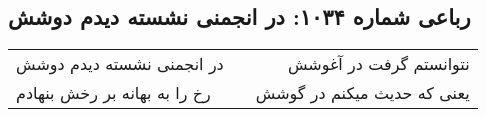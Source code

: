 \begin{center}
\section*{رباعی شماره ۱۰۳۴: در انجمنی نشسته دیدم دوشش}
\label{sec:1034}
\begin{longtable}{l p{0.5cm} r}
در انجمنی نشسته دیدم دوشش
&&
نتوانستم گرفت در آغوشش
\\
رخ را به بهانه بر رخش بنهادم
&&
یعنی که حدیث میکنم در گوشش
\\
\end{longtable}
\end{center}
